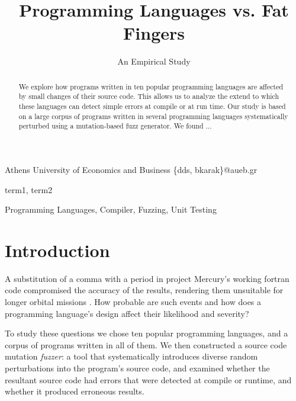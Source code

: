 \documentclass[10pt]{sigplanconf}
\begin{document}
\copyrightdata{[to be supplied]}


\title{Programming Languages vs. Fat Fingers}
\subtitle{An Empirical Study}

   {Athens University of Economics and Business}
   {\{dds, bkarak\}@aueb.gr}

\maketitle

\begin{abstract}
We explore how programs written in ten popular programming languages
are affected by small changes of their source code.
This allows us to analyze the extend to which these languages
can detect simple errors at compile or at run time.
Our study is based on a large corpus of programs written in several programming
languages systematically perturbed using a mutation-based fuzz generator.
We found ... %
\end{abstract}


\terms
term1, term2

\keywords
Programming Languages, Compiler, Fuzzing, Unit Testing

\section{Introduction} %
A substitution of a comma with a period in project Mercury's working
{\sc fortran} code compromised the accuracy of the results,
rendering them unsuitable for longer orbital missions \cite{Brad89,Neu95}.
How probable are such events and how does a programming language's
design affect their likelihood and severity?

To study these questions we chose ten popular programming languages,
and a corpus of programs written in all of them.
We then constructed a source code mutation {\em fuzzer}:
a tool that systematically introduces diverse random perturbations
into the program's source code,
and examined whether the resultant source code had errors that
were detected at compile or runtime, and whether it produced
erroneous results.
\end{document}

